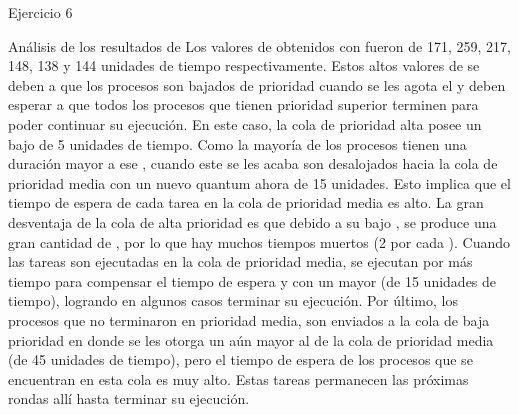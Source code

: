 
\begin{section}{Ejercicio 6}

\begin{subsection}{Análisis de los resultados de }
	Los valores de  obtenidos con  fueron de 171, 259, 217, 148, 138 y 144 unidades de tiempo respectivamente. Estos altos valores de  se deben a que los procesos son bajados de prioridad cuando se les agota el  y deben esperar a que todos los procesos que tienen prioridad superior terminen para poder continuar su ejecución. En este caso, la cola de prioridad alta posee un  bajo de 5 unidades de tiempo. Como la mayoría de los procesos tienen una duración mayor a ese , cuando este se les acaba son desalojados hacia la cola de prioridad media con un nuevo quantum ahora de 15 unidades. Esto implica que el tiempo de espera de cada tarea en la cola de prioridad media es alto. La gran desventaja de la cola de alta prioridad es que debido a su bajo , se produce una gran cantidad de , por lo que hay muchos tiempos muertos (2 por cada ). Cuando las tareas son ejecutadas en la cola de prioridad media, se ejecutan por más tiempo para compensar el tiempo de espera y con un  mayor (de 15 unidades de tiempo), logrando en algunos casos terminar su ejecución. Por último, los procesos que no terminaron en prioridad media, son enviados a la cola de baja prioridad en donde se les otorga un  aún mayor al de la cola de prioridad media (de 45 unidades de tiempo), pero el tiempo de espera de los procesos que se encuentran en esta cola es muy alto. Estas tareas permanecen las próximas rondas allí hasta terminar su ejecución.
\end{subsection}

\end{section}

